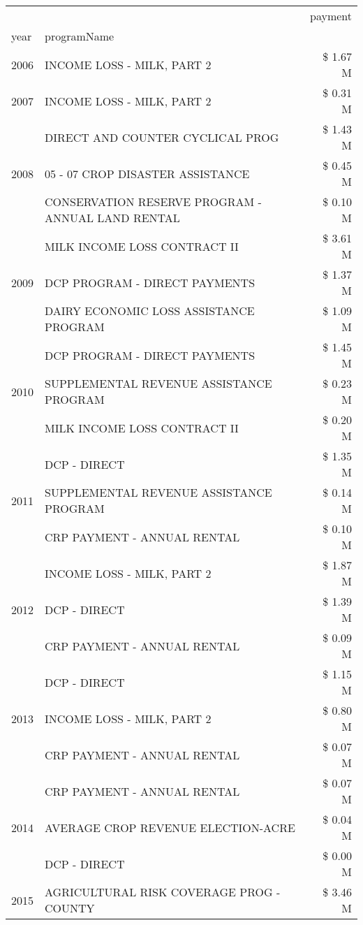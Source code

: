 \begin{tabular}{llr}
\toprule
 &  & payment \\
year & programName &  \\
\midrule
2006 & INCOME LOSS - MILK, PART 2 & \$ 1.67 M \\
\cline{1-3}
2007 & INCOME LOSS - MILK, PART 2 & \$ 0.31 M \\
\cline{1-3}
\multirow[t]{3}{*}{2008} & DIRECT AND COUNTER CYCLICAL PROG & \$ 1.43 M \\
 & 05 - 07 CROP DISASTER ASSISTANCE & \$ 0.45 M \\
 & CONSERVATION RESERVE PROGRAM - ANNUAL LAND RENTAL & \$ 0.10 M \\
\cline{1-3}
\multirow[t]{3}{*}{2009} & MILK INCOME LOSS CONTRACT II & \$ 3.61 M \\
 & DCP PROGRAM - DIRECT PAYMENTS & \$ 1.37 M \\
 & DAIRY ECONOMIC LOSS ASSISTANCE PROGRAM & \$ 1.09 M \\
\cline{1-3}
\multirow[t]{3}{*}{2010} & DCP PROGRAM - DIRECT PAYMENTS & \$ 1.45 M \\
 & SUPPLEMENTAL REVENUE ASSISTANCE PROGRAM & \$ 0.23 M \\
 & MILK INCOME LOSS CONTRACT II & \$ 0.20 M \\
\cline{1-3}
\multirow[t]{3}{*}{2011} & DCP - DIRECT & \$ 1.35 M \\
 & SUPPLEMENTAL REVENUE ASSISTANCE PROGRAM & \$ 0.14 M \\
 & CRP PAYMENT - ANNUAL RENTAL & \$ 0.10 M \\
\cline{1-3}
\multirow[t]{3}{*}{2012} & INCOME LOSS - MILK, PART 2 & \$ 1.87 M \\
 & DCP - DIRECT & \$ 1.39 M \\
 & CRP PAYMENT - ANNUAL RENTAL & \$ 0.09 M \\
\cline{1-3}
\multirow[t]{3}{*}{2013} & DCP - DIRECT & \$ 1.15 M \\
 & INCOME LOSS - MILK, PART 2 & \$ 0.80 M \\
 & CRP PAYMENT - ANNUAL RENTAL & \$ 0.07 M \\
\cline{1-3}
\multirow[t]{3}{*}{2014} & CRP PAYMENT - ANNUAL RENTAL & \$ 0.07 M \\
 & AVERAGE CROP REVENUE ELECTION-ACRE & \$ 0.04 M \\
 & DCP - DIRECT & \$ 0.00 M \\
\cline{1-3}
\multirow[t]{3}{*}{2015} & AGRICULTURAL RISK COVERAGE PROG - COUNTY & \$ 3.46 M \\

\end{tabular}
